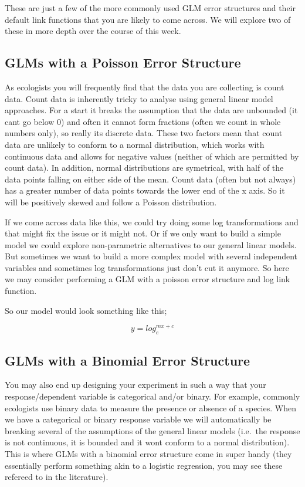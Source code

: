 \documentclass[
]{book}
\begin{document}
These are just a few of the more commonly used GLM error structures and their default link functions that you are likely to come across. We will explore two of these in more depth over the course of this week.

\hypertarget{glms-with-a-poisson-error-structure}{%
\subsection{GLMs with a Poisson Error Structure}\label{glms-with-a-poisson-error-structure}}

As ecologists you will frequently find that the data you are collecting is count data. Count data is inherently tricky to analyse using general linear model approaches. For a start it breaks the assumption that the data are unbounded (it cant go below 0) and often it cannot form fractions (often we count in whole numbers only), so really its discrete data. These two factors mean that count data are unlikely to conform to a normal distribution, which works with continuous data and allows for negative values (neither of which are permitted by count data). In addition, normal distributions are symetrical, with half of the data points falling on either side of the mean. Count data (often but not always) has a greater number of data points towards the lower end of the x axis. So it will be positively skewed and follow a Poisson distribution.

If we come across data like this, we could try doing some log transformations and that might fix the issue or it might not. Or if we only want to build a simple model we could explore non-parametric alternatives to our general linear models. But sometimes we want to build a more complex model with several independent variables and sometimes log transformations just don't cut it anymore. So here we may consider performing a GLM with a poisson error structure and log link function.

So our model would look something like this;

\[
y = log_e^{mx+c}
\]

\hypertarget{glms-with-a-binomial-error-structure}{%
\subsection{GLMs with a Binomial Error Structure}\label{glms-with-a-binomial-error-structure}}

You may also end up designing your experiment in such a way that your response/dependent variable is categorical and/or binary. For example, commonly ecologists use binary data to measure the presence or absence of a species. When we have a categorical or binary response variable we will automatically be breaking several of the assumptions of the general linear models (i.e.~the response is not continuous, it is bounded and it wont conform to a normal distribution). This is where GLMs with a binomial error structure come in super handy (they essentially perform something akin to a logistic regression, you may see these refereed to in the literature).
\end{document}

